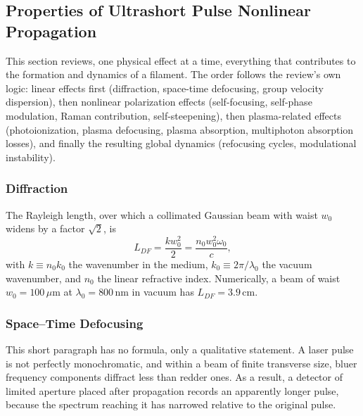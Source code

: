 \documentclass[11pt,a4paper]{article}
\begin{document}
\subsection{Properties of Ultrashort Pulse Nonlinear Propagation}

This section reviews, one physical effect at a time, everything that contributes to the formation and dynamics of a filament. The order follows the review's own logic: linear effects first (diffraction, space-time defocusing, group velocity dispersion), then nonlinear polarization effects (self-focusing, self-phase modulation, Raman contribution, self-steepening), then plasma-related effects (photoionization, plasma defocusing, plasma absorption, multiphoton absorption losses), and finally the resulting global dynamics (refocusing cycles, modulational instability).

\subsubsection{Diffraction}
The Rayleigh length, over which a collimated Gaussian beam with waist $w_0$ widens by a factor $\sqrt{2}$, is
\begin{equation}
L_{DF} = \frac{k w_0^2}{2} = \frac{n_0 w_0^2 \omega_0}{c},
\end{equation}
with $k\equiv n_0k_0$ the wavenumber in the medium, $k_0\equiv 2\pi/\lambda_0$ the vacuum wavenumber, and $n_0$ the linear refractive index. Numerically, a beam of waist $w_0=100\,\mu\text{m}$ at $\lambda_0=800\,\text{nm}$ in vacuum has $L_{DF}=3.9\,\text{cm}$.

\subsubsection{Space--Time Defocusing}
This short paragraph has no formula, only a qualitative statement. A laser pulse is not perfectly monochromatic, and within a beam of finite transverse size, bluer frequency components diffract less than redder ones. As a result, a detector of limited aperture placed after propagation records an apparently longer pulse, because the spectrum reaching it has narrowed relative to the original pulse.
\end{document}
